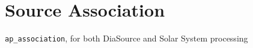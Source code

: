 \section{Source Association}
\label{sec:association}

\texttt{ap\_association}, for both DiaSource and Solar System processing
